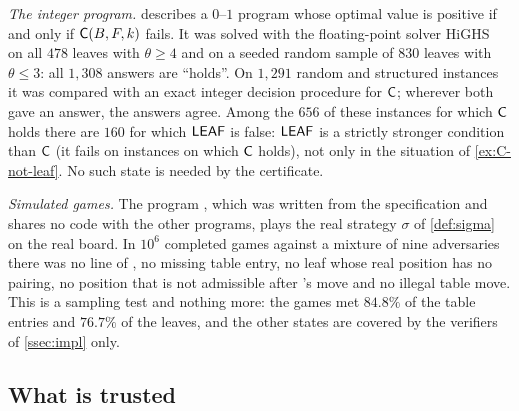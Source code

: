 \emph{The integer program.}  describes a $0$--$1$ program whose optimal value is positive if
and only if $\mathsf{C}(B,F,k)$ fails. It was solved with the floating-point solver
HiGHS~\cite{HuangfuHall2018} on all $478$ leaves with $\theta\ge4$ and on a seeded random sample of $830$
leaves with $\theta\le 3$: all $1{,}308$ answers are ``holds''. On $1{,}291$ random and structured
instances it was compared with an exact integer decision procedure for $\mathsf{C}$; wherever both gave an
answer, the answers agree. Among the $656$ of these instances for which $\mathsf{C}$ holds there are $160$ for
which $\mathsf{LEAF}$ is false: $\mathsf{LEAF}$ is a strictly stronger condition than $\mathsf{C}$ (it fails on instances on
which $\mathsf{C}$ holds), not only in the situation of \cref{ex:C-not-leaf}. No such state is needed by the
certificate.

\emph{Simulated games.} The program , which was written from the specification and shares
no code with the other programs, plays the real strategy $\sigma$ of \cref{def:sigma} on the real board.
In $10^6$ completed games against a mixture of nine adversaries there was no line of \Maker, no missing
table entry, no leaf whose real position has no pairing, no position that is not admissible after
\Breaker's move and no illegal table move. This is a sampling test and nothing more: the games met
$84.8\%$ of the table entries and $76.7\%$ of the leaves, and the other states are covered by the
verifiers of \cref{ssec:impl} only.


\subsection{What is trusted}\label{ssec:trust}

